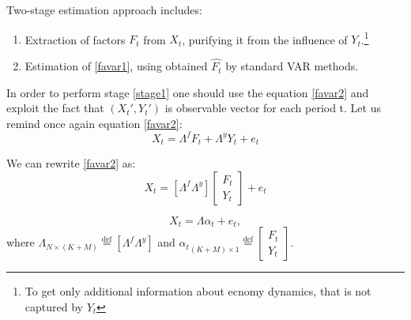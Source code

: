 \documentclass[a4paper, 14pt]{article}
\begin{document}
Two-stage estimation approach includes:
\begin{enumerate}
	\item Extraction of factors $F_t$ from $X_t$, purifying it from the influence of $Y_t$.\footnote{To get only additional information about ecnomy dynamics, that is not captured by $Y_t$} \label{stage1}
	\item Estimation of \eqref{favar1}, using obtained $\hat{F_t}$ by standard VAR methods. \label{stage2}
\end{enumerate}
In order to perform stage \ref{stage1} one should use the equation \eqref{favar2} and exploit the fact that $(X_t', Y_t')$ is observable vector for each period t. Let us remind once again equation \eqref{favar2}:
\[X_t = \Lambda^f F_t + \Lambda^y Y_t + e_t\]

We can rewrite \eqref{favar2} as: 
\begin{equation}
X_t = \left[ \Lambda^f \Lambda^y \right] \begin{bmatrix}
F_t \\
Y_t 
\end{bmatrix} + e_t
\end{equation}

\begin{equation}
X_t = \Lambda \alpha_t + e_t, 
\end{equation}
where $\Lambda_{N \times (K+M)} \stackrel{\text{def}}{=} \left[ \Lambda^f \Lambda^y \right]$ and ${\alpha_t}_{(K+M) \times 1} \stackrel{\text{def}}{=} \begin{bmatrix}
F_t \\
Y_t 
\end{bmatrix}$.
\end{document}
